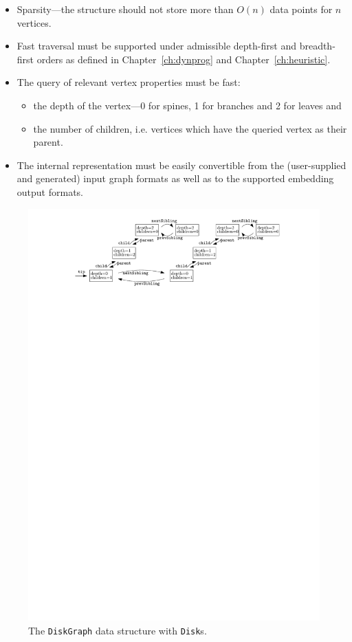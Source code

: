\begin{itemize}
    \item Sparsity---the structure should not store more than $O(n)$ data points for $n$ vertices.
    \item Fast traversal must be supported under admissible depth-first and breadth-first orders as defined in Chapter~\ref{ch:dynprog} and Chapter~\ref{ch:heuristic}.
    \item The query of relevant vertex properties must be fast:
    \begin{itemize}
        \item the depth of the vertex---0 for spines, 1 for branches and 2 for leaves and
        \item the number of children, i.e. vertices which have the queried vertex as their parent.
    \end{itemize}
    \item The internal representation must be easily convertible from the (user-supplied and generated) input graph formats as well as to the supported embedding output formats.
\end{itemize}

\begin{figure}
    \centering
    \includegraphics{graphics/ch6_diskgraph.pdf}
    \caption{The \texttt{DiskGraph} data structure with \texttt{Disk}s.}
    \label{fig:ch6_diskgraph}
\end{figure}

